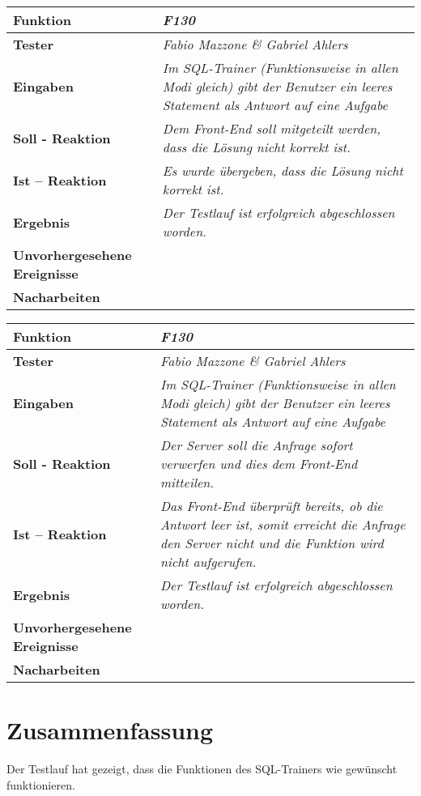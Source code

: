 \newpage
\begin{longtable}{|p{4cm}|p{11cm}|}
\hline
\textbf{Funktion} & \textit{\textbf{F130}} \\
\hline
\textbf{Tester} & \textit{Fabio Mazzone \& Gabriel Ahlers} \\
\hline
\textbf{Eingaben} & \textit{Im SQL-Trainer (Funktionsweise in allen Modi gleich) gibt der Benutzer ein leeres Statement als Antwort auf eine Aufgabe} \\
\hline
\textbf{Soll - Reaktion} & \textit{Dem Front-End soll mitgeteilt werden, dass die Lösung nicht korrekt ist.} \\
\hline
\textbf{Ist -- Reaktion} & \textit{Es wurde übergeben, dass die Lösung nicht korrekt ist.} \\
\hline
\textbf{Ergebnis} & \textit{Der Testlauf ist erfolgreich abgeschlossen worden.} \\
\hline
\textbf{Unvorhergesehene Ereignisse} &
\textit{} \\
\hline
\textbf{Nacharbeiten } & \textit{} \\
\hline
\end{longtable}

\newpage
\begin{longtable}{|p{4cm}|p{11cm}|}
\hline
\textbf{Funktion} & \textit{\textbf{F130}} \\
\hline
\textbf{Tester} & \textit{Fabio Mazzone \& Gabriel Ahlers} \\
\hline
\textbf{Eingaben} & \textit{Im SQL-Trainer (Funktionsweise in allen Modi gleich) gibt der Benutzer ein leeres Statement als Antwort auf eine Aufgabe} \\
\hline
\textbf{Soll - Reaktion} & \textit{Der Server soll die Anfrage sofort verwerfen und dies dem Front-End mitteilen.} \\
\hline
\textbf{Ist -- Reaktion} & \textit{Das Front-End überprüft bereits, ob die Antwort leer ist, somit erreicht die Anfrage den Server nicht und die Funktion wird nicht aufgerufen.} \\
\hline
\textbf{Ergebnis} & \textit{Der Testlauf ist erfolgreich abgeschlossen worden.} \\
\hline
\textbf{Unvorhergesehene Ereignisse} &
\textit{} \\
\hline
\textbf{Nacharbeiten } & \textit{} \\
\hline
\end{longtable}

\section{Zusammenfassung}

Der Testlauf hat gezeigt, dass die Funktionen des SQL-Trainers wie gewünscht funktionieren.
